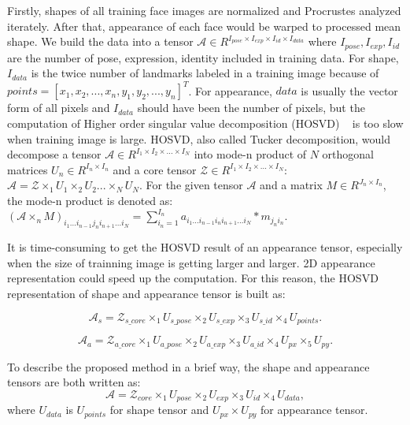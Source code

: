 		Firstly, shapes of all training face images are normalized and Procrustes analyzed iterately. After that, appearance of each face would be warped to processed mean shape. We build the data into a tensor $\mathcal{A} \in R^{I_{pose} \times I_{exp} \times I_{id} \times I_{data}}$ where $I_{pose}, I_{exp}, I_{id}$ are the number of pose, expression, identity included in training data. For shape, $I_{data}$ is the twice number of landmarks labeled in a training image because of $points = [x_1,x_2,...,x_n,y_1,y_2,...,y_n]^T$. For appearance, $data$ is usually the vector form of all pixels and $I_{data}$ should have been the number of pixels, but the computation of Higher order singular value decomposition (HOSVD) ~\cite{Lathauwer00} is too slow when training image is large. HOSVD, also called Tucker decomposition, would decompose a tensor $\mathcal{A} \in R^{I_1 \times I_2 \times ... \times I_N}$ into mode-n product of $N$ orthogonal matrices $U_n \in R^{I_n \times I_n}$ and a core tensor $\mathcal{Z} \in R^{I_1 \times I_2 \times ... \times I_N}$: $\mathcal{A} = \mathcal{Z} \times_1 U_1 \times_2 U_2 ... \times_N U_N$. For the given tensor $\mathcal{A}$ and a matrix $M \in R^{J_n \times I_n}$, the mode-n product is denoted as: $(\mathcal{A} \times_n M)_{i_1...i_{n-1}j_ni_{n+1}...i_N} = \sum_{i_n=1}^{I_n}a_{i_1...i_{n-1}i_ni_{n+1}...i_N}*m_{j_ni_n}$.

		It is time-consuming to get the HOSVD result of an appearance tensor, especially when the size of trainning image is getting larger and larger. 2D appearance representation \cite{Feng12} could speed up the computation. For this reason, the HOSVD representation of shape and appearance tensor is built as:

		\begin{equation}
			\mathcal{A}_{s} = \mathcal{Z}_{s\_core} \times_1 U_{s\_pose} \times_2 U_{s\_exp} \times_3 U_{s\_id} \times_4 U_{points}.
		\end{equation}

		\begin{equation}
			\mathcal{A}_{a} = \mathcal{Z}_{a\_core} \times_1 U_{a\_pose} \times_2 U_{a\_exp} \times_3 U_{a\_id} \times_4 U_{px} \times_5 U_{py}.
		\end{equation}
		
		To describe the proposed method in a brief way, the shape and appearance tensors are both written as:
		\begin{equation}
			\mathcal{A} = \mathcal{Z}_{core} \times_1 U_{pose} \times_2 U_{exp} \times_3 U_{id} \times_4 U_{data},
			\label{base_equation}
		\end{equation}
		where $U_{data}$ is $U_{points}$ for shape tensor and $U_{px} \times U_{py}$ for appearance tensor.

